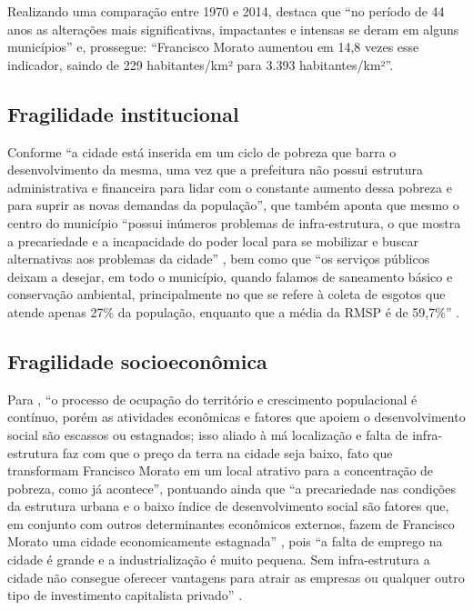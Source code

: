 	Realizando uma comparação entre 1970 e 2014,  destaca que ``no período de 44 anos as alterações mais significativas, impactantes e intensas se deram	em alguns municípios'' e, prossegue: ``Francisco Morato aumentou em 14,8 vezes esse indicador, saindo de 229 habitantes/km² para 3.393 habitantes/km²''.
	
	\subsection{Fragilidade institucional}
	
	Conforme  ``a cidade está inserida em um ciclo de pobreza que barra o desenvolvimento da	mesma, uma vez que a prefeitura não possui estrutura administrativa e financeira para lidar com o constante aumento dessa pobreza e para suprir as novas demandas da população'', que também aponta que mesmo o centro do município ``possui inúmeros problemas de infra-estrutura, o que mostra a precariedade e a incapacidade do poder local para	se mobilizar e buscar alternativas aos problemas da cidade'' \cite[p.61]{cassiele2007a}, bem como que ``os serviços públicos deixam a desejar, em todo o município, quando falamos de saneamento básico e conservação ambiental, principalmente no que se refere à coleta de esgotos que atende apenas 27\% da população, enquanto que a média da RMSP é de 59,7\%'' \cite[p.63]{cassiele2007a}.
	
	\subsection{Fragilidade socioeconômica}
	
	Para , ``o processo de ocupação do território e crescimento populacional é contínuo, porém as atividades econômicas e fatores que apoiem o desenvolvimento social são escassos ou estagnados; isso aliado à má localização e falta de infra-estrutura faz com que o preço da terra na cidade seja baixo, fato que transformam Francisco Morato em um local atrativo para a concentração de pobreza, como já acontece'', pontuando ainda que ``a precariedade nas condições da estrutura urbana e o baixo índice de desenvolvimento
	social são fatores que, em conjunto com outros determinantes econômicos externos, fazem de Francisco Morato uma cidade economicamente estagnada'' \cite[p.92]{cassiele2007a}, pois ``a falta de emprego na cidade é grande e a industrialização é muito pequena. Sem infra-estrutura a cidade não consegue oferecer vantagens para atrair as empresas ou qualquer outro
	tipo de investimento capitalista privado'' \cite[p.99]{cassiele2007a}.
	
